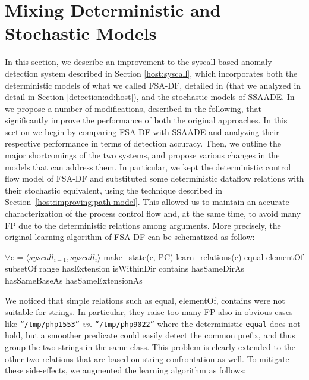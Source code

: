 \section{Mixing Deterministic and Stochastic Models}
\label{host:improving}
In this section, we describe an improvement to the syscall-based anomaly detection system described in Section \ref{host:syscall}, which incorporates both the deterministic models of what we called FSA-DF, detailed in \citep{venkat_dataflow} (that we analyzed in detail in Section \ref{detection:ad:host}), and the stochastic models of \ac{SSAADE}. In \citep{2009_frossi_maggi_rizzo_zanero_improving_syscall_models} we propose a number of modifications, described in the following, that significantly improve the performance of both the original approaches. In this section we begin by comparing FSA-DF with \ac{SSAADE} and analyzing their respective performance in terms of detection accuracy. Then, we outline the major shortcomings of the two systems, and propose various changes in the models that can address them. In particular, we kept the deterministic control flow model of FSA-DF and substituted some deterministic dataflow relations with their stochastic equivalent, using the technique described in Section~\ref{host:improving:path-model}. This allowed us to maintain an accurate characterization of the process control flow and, at the same time, to avoid many \ac{FP} due to the deterministic relations among arguments. More precisely, the original learning algorithm of FSA-DF can be schematized as follow:

\begin{pseudo}
  $\forall \mathtt{c} = \langle syscall_{i-1}, syscall_{i} \rangle$
  make_state(c, PC)
  learn_relations(c)
    equal
    elementOf
    subsetOf
    range
    hasExtension
    isWithinDir
    contains
    hasSameDirAs
    hasSameBaseAs
    hasSameExtensionAs
\end{pseudo}

We noticed that simple relations such as \textsf{equal}, \textsf{elementOf}, \textsf{contains} were not suitable for strings. In particular, they raise too many \ac{FP} also in obvious cases like \texttt{``/tmp/php1553''} \emph{vs.} \texttt{``/tmp/php9022''} where the deterministic \texttt{equal} does not hold, but a smoother predicate could easily detect the common prefix, and thus group the two strings in the same class. This problem is clearly extended to the other two relations that are based on string confrontation as well. To mitigate these side-effects, we augmented the learning algorithm as follows:

